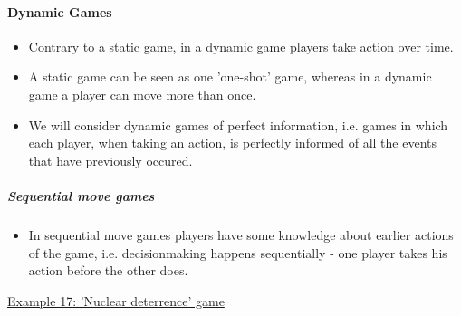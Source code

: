 \paragraph{Dynamic Games}

\begin{itemize}
    \item Contrary to a static game, in a dynamic game players take action
        over time.
    \item A static game can be seen as one 'one-shot' game, whereas in a dynamic
        game a player can move more than once.
    \item We will consider dynamic games of perfect information, i.e. games in
        which each player, when taking an action, is perfectly informed of all
        the events that have previously occured.
\end{itemize}

\subparagraph{Sequential move games}

\begin{itemize}
    \item In sequential move games players have some knowledge about earlier
        actions of the game, i.e. decisionmaking happens sequentially - one
        player takes his action before the other does.
\end{itemize}

\vspace{1\baselineskip}

\underline{Example 17: 'Nuclear deterrence' game}

